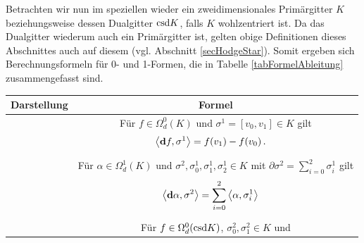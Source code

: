   \begin{bemerkung}
    Betrachten wir nun im speziellen wieder ein zweidimensionales Primärgitter \( K \) beziehungsweise dessen Dualgitter \( \text{csd} K \), 
    falls \( K \) wohlzentriert ist.
    Da das Dualgitter wiederum auch ein Primärgitter ist, gelten obige Definitionen dieses Abschnittes auch auf diesem
    (vgl. Abschnitt \ref{secHodgeStar}).
    Somit ergeben sich Berechnungsformeln für 0- und 1-Formen, die in Tabelle \ref{tabFormelAbleitung} zusammengefasst sind.
    \begin{table}[htbp]
    \begin{tabular}{|c|c|} \hline
      Darstellung & Formel \\\hline
      \begin{minipage}[c]{0.29\textwidth}
        \centering
      \end{minipage} &
      \begin{minipage}[c]{0.69\textwidth}
        Für \( f\in\Omega_{d}^{0}(K) \) und \( \sigma^{1}=\left[ v_{0}, v_{1} \right]\in K \) gilt
        {\begin{align}
          \label{eqAbleitungKante}
          \left\langle \mathbf{d} f , \sigma^{1} \right\rangle &= f(v_{1}) - f(v_{0}) \,\text{.}
        \end{align}}
      \end{minipage} \\\hline
      \begin{minipage}[c]{0.29\textwidth}
        \centering
      \end{minipage} &
      \begin{minipage}[c]{0.69\textwidth}
      Für \( \alpha\in\Omega_{d}^{1}(K) \) und \( \sigma^{2},\sigma^{1}_{0},\sigma^{1}_{1},\sigma^{1}_{2} \in K \) 
      mit \( \partial\sigma^{2} = \sum_{i=0}^{2} \sigma^{1}_{i} \) gilt
        {\begin{align}
          \left\langle \mathbf{d} \alpha , \sigma^{2} \right\rangle &= \sum_{i=0}^{2} \left\langle \alpha, \sigma_{i}^{1}\right\rangle
        \end{align}}
      \end{minipage} \\\hline
      \begin{minipage}[c]{0.29\textwidth}
        \centering
      \end{minipage} &
      \begin{minipage}[c]{0.69\textwidth}
        Für \( f\in\Omega_{d}^{0}(\text{csd} K) \), \( \sigma^{2}_{0}, \sigma^{2}_{1} \in K \) und 

\end{minipage}
\end{tabular}
\end{table}
\end{bemerkung}
